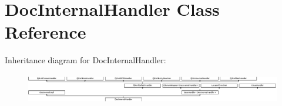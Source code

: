\hypertarget{class_doc_internal_handler}{}\section{Doc\+Internal\+Handler Class Reference}
\label{class_doc_internal_handler}
Inheritance diagram for Doc\+Internal\+Handler\+:\begin{figure}[H]
\begin{center}
\leavevmode
\includegraphics[height=1.322314cm]{class_doc_internal_handler}
\end{center}
\end{figure}
